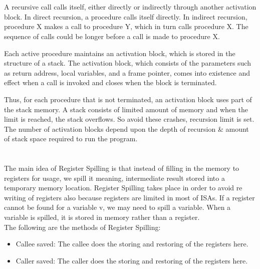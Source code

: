 \documentclass[12pt]{article}
\begin{document}
\maketitle

\section{}

A recursive call calls itself, either directly or indirectly through another activation block. In direct recursion, a procedure calls itself directly. In indirect recursion, procedure X makes a call to procedure Y, which in turn calls procedure X. The sequence of calls could be longer before a call is made to procedure X.

Each active procedure maintains an activation block, which is stored in the structure of a stack. The activation block, which consists of the parameters such as return address, local variables, and a frame pointer, comes into existence and effect when a call is invoked and closes when the block is terminated. 

Thus, for each procedure that is not terminated, an activation block uses part of the stack memory. A stack consists of limited amount of memory and when the limit is reached, the stack overflows. So avoid these crashes, recursion limit is set. The number of activation blocks depend upon the depth of recursion \& amount of stack space required to run the program.

\section{}
The main idea of Register Spilling is that instead of filling in the memory to registers for usage, we spill it meaning, intermediate result stored into a temporary memory location. Register Spilling takes place in order to avoid re writing of registers also because registers are limited in most of ISAs. If a register cannot be found for a variable v, we may need to spill a variable. When a variable is spilled, it is stored in memory rather than a register. \\

The following are the methods of Register Spilling:
\begin{itemize}
    \item Callee saved: The callee does the storing and restoring of the registers here.
    \item Caller saved: The caller does the storing and restoring of the registers here.

\end{itemize}
\end{document}
